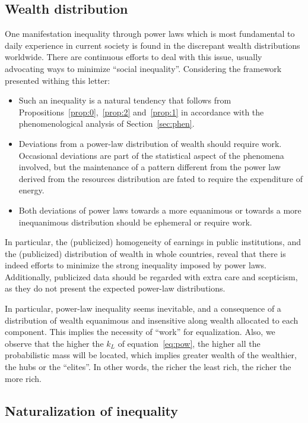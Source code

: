\documentclass[a4paper, 11pt]{article} %
\begin{document}
\subsection{Wealth distribution}
One manifestation inequality through power laws
which is most fundamental to daily experience
in current society is found in the discrepant wealth distributions worldwide.
There are continuous efforts to deal with this issue,
usually advocating ways to minimize ``social inequality''.
Considering the framework presented withing this letter:

\begin{itemize}
	\item Such an inequality is a natural tendency that follows from Propositions~\ref{prop:0},~\ref{prop:2} and~\ref{prop:1} in accordance with the phenomenological analysis of Section~\ref{sec:phen}.
	\item Deviations from a power-law distribution of wealth should require work.
		Occasional deviations are part of the statistical aspect of the phenomena involved, but the maintenance of a pattern different from the power law derived from the resources distribution are fated to require the expenditure of energy.
	\item Both deviations of power laws towards a more equanimous or towards a more inequanimous distribution should be ephemeral or require work.
\end{itemize}

In particular, the (publicized)
homogeneity of earnings in public institutions,
and the (publicized) distribution of wealth in whole countries,
reveal that there is indeed efforts to minimize
the strong inequality imposed by power laws.
Additionally, publicized data should be regarded with
extra care and scepticism, as they do not present the
expected power-law distributions.

In particular, power-law inequality seems inevitable,
and a consequence of a distribution of wealth equanimous and insensitive
along wealth allocated to each component.
This implies the necessity of ``work'' for equalization.
Also, we observe that the higher the $k_L$ of equation~\ref{eq:pow}, the
higher all the probabilistic mass will be located, which
implies greater wealth of the wealthier, the hubs or the ``elites''.
In other words, the richer the least rich,
the richer the more rich.

\subsection{Naturalization of inequality}
\end{document}
